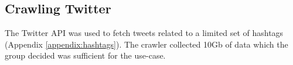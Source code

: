 \subsection{Crawling Twitter}

The Twitter API \cite{twitterapi} was used to fetch tweets related to a limited
set of hashtags (Appendix \ref{appendix:hashtags}). The crawler collected 10Gb
of data which the group decided was sufficient for the use-case.



